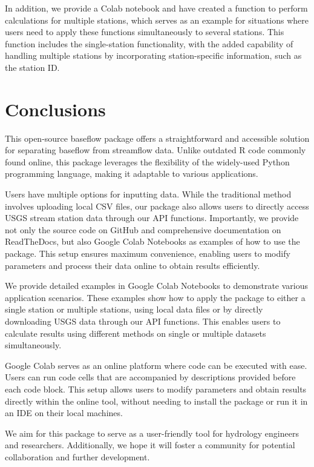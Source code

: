 \documentclass[hydrology,article,submit,pdftex,moreauthors]{Definitions/mdpi}
\begin{document}
In addition, we provide a Colab notebook and have created a function to perform calculations for multiple stations, which serves as an example for situations where users need to apply these functions simultaneously to several stations. This function includes the single-station functionality, with the added capability of handling multiple stations by incorporating station-specific information, such as the station ID.

\section{Conclusions}
\label{sec:conclusions}

This open-source baseflow package offers a straightforward and accessible solution for separating baseflow from streamflow data. Unlike outdated R code commonly found online, this package leverages the flexibility of the widely-used Python programming language, making it adaptable to various applications.

Users have multiple options for inputting data. While the traditional method involves uploading local CSV files, our package also allows users to directly access USGS stream station data through our API functions. Importantly, we provide not only the source code on GitHub and comprehensive documentation on ReadTheDocs, but also Google Colab Notebooks as examples of how to use the package. This setup ensures maximum convenience, enabling users to modify parameters and process their data online to obtain results efficiently.

We provide detailed examples in Google Colab Notebooks to demonstrate various application scenarios. These examples show how to apply the package to either a single station or multiple stations, using local data files or by directly downloading USGS data through our API functions. This enables users to calculate results using different methods on single or multiple datasets simultaneously.

Google Colab serves as an online platform where code can be executed with ease. Users can run code cells that are accompanied by descriptions provided before each code block. This setup allows users to modify parameters and obtain results directly within the online tool, without needing to install the package or run it in an IDE on their local machines.

We aim for this package to serve as a user-friendly tool for hydrology engineers and researchers. Additionally, we hope it will foster a community for potential collaboration and further development.
\end{document}
